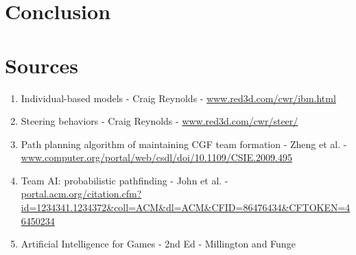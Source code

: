 \documentclass{article}
\begin{document}
\section {Conclusion}


\section {Sources}
\begin{enumerate}
\item Individual-based models - Craig Reynolds - \url{www.red3d.com/cwr/ibm.html}
\item Steering behaviors - Craig Reynolds - \url{www.red3d.com/cwr/steer/}
\item Path planning algorithm of maintaining CGF team formation - Zheng et al. - \url{www.computer.org/portal/web/csdl/doi/10.1109/CSIE.2009.495}
\item Team AI: probabilistic pathfinding - John et al. - \url{portal.acm.org/citation.cfm?id=1234341.1234372&coll=ACM&dl=ACM&CFID=86476434&CFTOKEN=46450234}
\item Artificial Intelligence for Games - 2nd Ed - Millington and Funge
\end{enumerate}
\end{document}
